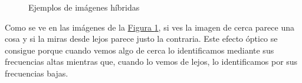 \documentclass[11pt,a4paper]{article}
\theoremstyle{plain}
\theoremstyle{definition}
\begin{document}
\begin{figure}[!h]
    \centering
    \qquad
    \caption{Ejemplos de imágenes híbridas}
    \label{hybrid}
\end{figure}

Como se ve en las imágenes de la \hyperref[hybrid]{Figura \ref*{hybrid}}, si ves la imagen de cerca parece una cosa y si la miras desde lejos parece justo la contraria. Este efecto óptico se consigue porque cuando vemos algo de cerca lo identificamos mediante sus frecuencias altas mientras que, cuando lo vemos de lejos, lo identificamos por sus frecuencias bajas.
\end{document}
